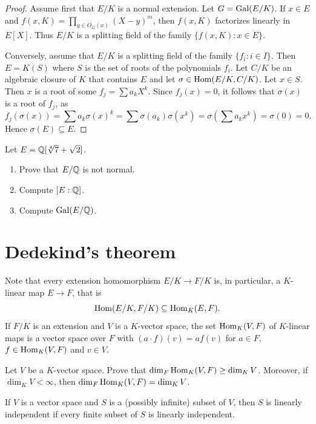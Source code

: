 \begin{proof}
    Assume first that $E/K$ is a normal extension. 
    Let $G=\operatorname{Gal}(E/K)$.  If $x\in E$ and $f(x,K)=\prod_{y\in O_G(x)}(X-y)^m$, 
    then $f(x,K)$ factorizes linearly in $E[X]$. Thus 
    $E/K$ is a splitting field of the family 
    $\{f(x,K):x\in E\}$. 
    
    Conversely, assume that $E/K$ is a splitting field of the family 
    $\{f_i:i\in I\}$. Then $E=K(S)$ where $S$ is the set of roots
    of the polynomials $f_i$. Let $C/K$ be an algebraic closure
    of $K$ that contains $E$ and let $\sigma\in\operatorname{Hom}(E/K,C/K)$. Let $x\in S$. 
    Then $x$ is a root of some $f_j=\sum a_kX^k$. Since $f_j(x)=0$, 
    it follows that $\sigma(x)$ is a root of $f_j$, as 
    \[
    f_j(\sigma(x))=\sum a_k\sigma(x)^k
    =\sum\sigma(a_k)\sigma(x^k)
    =\sigma\left(\sum a_kx^k\right)=\sigma(0)=0.
    \]
    Hence $\sigma(E)\subseteq E$. 
\end{proof}

\begin{exercise}
\label{xca:Q[sqrt[4]{7}+sqrt{2}]}
    Let $E=\mathbb{Q}[\sqrt[4]{7}+\sqrt{2}]$. 
    \begin{enumerate}
        \item Prove that $E/\mathbb{Q}$ is not normal. 
        \item Compute $[E:\mathbb{Q}]$.
        \item Compute $\operatorname{Gal}(E/\mathbb{Q})$. 
    \end{enumerate}
\end{exercise}


\section{Dedekind's theorem}

Note that every extension homomorphism $E/K\to F/K$ is, in particular, 
a $K$-linear map $E\to F$, that is
\[
\operatorname{Hom}(E/K,F/K)\subseteq\operatorname{Hom}_K(E,F).
\]
If $F/K$ is an extension and $V$ 
is a $K$-vector space, the set
$\operatorname{Hom}_K(V,F)$ of $K$-linear maps
is a vector space over $F$ with
$(a\cdot f)(v)=af(v)$ for $a\in F$, 
$f\in\operatorname{Hom}_K(V,F)$ and $v\in V$. 

\begin{exercise}
\label{xca:dim}
    Let $V$ be a $K$-vector space. 
    Prove that $\dim_F\operatorname{Hom}_K(V,F)\geq\dim_KV$. Moreover, if 
     $\dim_KV<\infty$, then $\dim_F\operatorname{Hom}_K(V,F)=\dim_KV$.
\end{exercise}

If $V$ is a vector space and $S$ is a (possibly infinite) subset of $V$, 
then $S$ is linearly independent if every finite subset of $S$ is linearly independent. 

